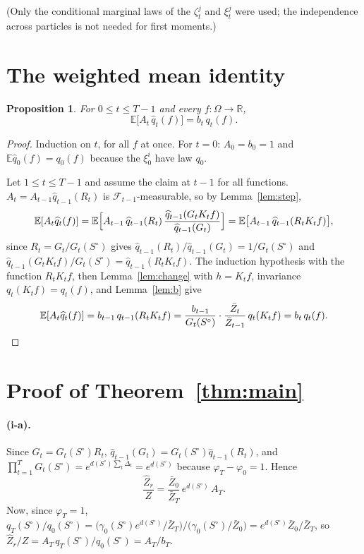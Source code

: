 \documentclass[11pt]{article}
\newtheorem{proposition}[theorem]{Proposition}
\theoremstyle{remark}
\newcommand{\E}{\mathbb{E}}
\newcommand{\F}{\mathcal{F}}
\newcommand{\Om}{\Omega}
\newcommand{\qh}{\widehat q}
\newcommand{\Zh}{\widehat Z}
\newcommand{\Zb}{\bar Z}
\newcommand{\So}{S^{\circ}}
\begin{document}
(Only the conditional marginal laws of the $\zeta_t^j$ and $\xi_t^j$ were used; the independence across particles is not
needed for first moments.)

\section{The weighted mean identity}

\begin{proposition}\label{prop:unbiased}
For $0\le t\le T-1$ and every $f:\Om\to\mathbb R$,
\[
\E\bigl[A_t\,\qh_t(f)\bigr]=b_t\,q_t(f).
\]
\end{proposition}
\begin{proof}
Induction on $t$, for all $f$ at once. For $t=0$: $A_0=b_0=1$ and $\E\qh_0(f)=q_0(f)$ because the $\xi_0^i$ have law $q_0$.

Let $1\le t\le T-1$ and assume the claim at $t-1$ for all functions. $A_t=A_{t-1}\qh_{t-1}(R_t)$ is
$\F_{t-1}$-measurable, so by Lemma~\ref{lem:step},
\[
\E[A_t\qh_t(f)]=\E\Bigl[A_{t-1}\,\qh_{t-1}(R_t)\,\frac{\qh_{t-1}(G_tK_tf)}{\qh_{t-1}(G_t)}\Bigr]
=\E\bigl[A_{t-1}\,\qh_{t-1}(R_tK_tf)\bigr],
\]
since $R_t=G_t/G_t(\So)$ gives $\qh_{t-1}(R_t)/\qh_{t-1}(G_t)=1/G_t(\So)$ and $\qh_{t-1}(G_tK_tf)/G_t(\So)
=\qh_{t-1}(R_tK_tf)$. The induction hypothesis with the function $R_tK_tf$, then Lemma~\ref{lem:change} with
$h=K_tf$, invariance $q_t(K_tf)=q_t(f)$, and Lemma~\ref{lem:b} give
\[
\E[A_t\qh_t(f)]=b_{t-1}\,q_{t-1}(R_tK_tf)=\frac{b_{t-1}}{G_t(\So)}\cdot\frac{\Zb_t}{\Zb_{t-1}}\,q_t(K_tf)=b_t\,q_t(f).
\qedhere
\]
\end{proof}

\section{Proof of Theorem~\ref{thm:main}}

\paragraph{(i-a).} Since $G_t=G_t(\So)R_t$, $\qh_{t-1}(G_t)=G_t(\So)\qh_{t-1}(R_t)$, and
$\prod_{t=1}^TG_t(\So)=e^{d(\So)\sum_t\Delta_t}=e^{d(\So)}$ because $\varphi_T-\varphi_0=1$. Hence
\[
\frac{\Zh_r}{Z}=\frac{\Zb_0}{\Zb_T}\,e^{d(\So)}\,A_T .
\]
Now, since $\varphi_T=1$, $q_T(\So)/q_0(\So)=\bigl(\gamma_0(\So)e^{d(\So)}/\Zb_T\bigr)\big/\bigl(\gamma_0(\So)/\Zb_0\bigr)
=e^{d(\So)}\Zb_0/\Zb_T$, so $\Zh_r/Z=A_T\,q_T(\So)/q_0(\So)=A_T/b_T$.
\end{document}
